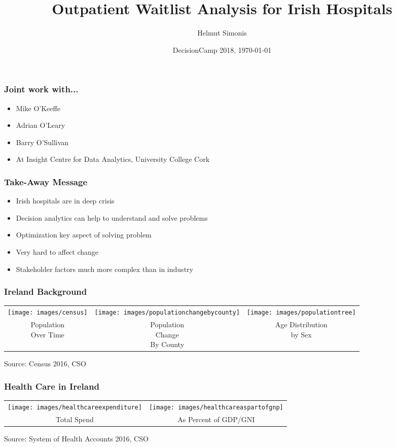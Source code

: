 \documentclass[dvipsnames]{beamer}
\author{Helmut Simonis}
\title{Outpatient Waitlist Analysis for Irish Hospitals}
\date{DecisionCamp 2018, \today}
\begin{document}
\begin{frame}[plain]
  \titlepage
\end{frame}

\begin{frame}
\frametitle{Joint work with...}
\begin{itemize}
\item Mike O'Keeffe
\item Adrian O'Leary
\item Barry O'Sullivan
\item At Insight Centre for Data Analytics, University College Cork
\end{itemize}
\end{frame}

\begin{frame}
\frametitle{Take-Away Message}
\begin{itemize}
\item Irish hospitals are in deep crisis
\item Decision analytics can help to understand and solve problems
\item Optimization key aspect of solving problem
\item Very hard to affect change
\item Stakeholder factors much more complex than in industry 
\end{itemize}
\end{frame}

\begin{frame}
\frametitle{Ireland Background}
\begin{tabular}{ccc}
\texttt{[image: images/census]}
&
\texttt{[image: images/populationchangebycounty]}
&
\texttt{[image: images/populationtree]}
\\
\shortstack{Population\\Over Time}
&
\shortstack{Population\\Change\\By County}
&
\shortstack{Age Distribution\\by Sex}
\end{tabular}

{\scriptsize Source: Census 2016, CSO}
\end{frame}

\begin{frame}
\frametitle{Health Care in Ireland}
\begin{tabular}{cc}
\texttt{[image: images/healthcareexpenditure]}
&
\texttt{[image: images/healthcareaspartofgnp]}\\
Total Spend & As Percent of GDP/GNI\\
\end{tabular}

\vspace{0.5cm}
{\scriptsize Source: System of Health Accounts 2016, CSO}
\end{frame}
\end{document}
